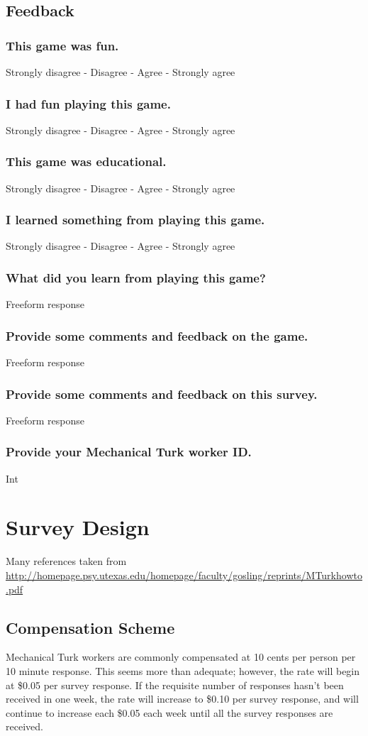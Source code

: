 	\subsection{Feedback}
		\subsubsection{This game was fun.} Strongly disagree - Disagree - Agree - Strongly agree
		\subsubsection{I had fun playing this game.} Strongly disagree - Disagree - Agree - Strongly agree
		\subsubsection{This game was educational.} Strongly disagree - Disagree - Agree - Strongly agree
		\subsubsection{I learned something from playing this game.} Strongly disagree - Disagree - Agree - Strongly agree
		\subsubsection{What did you learn from playing this game?} Freeform response
		\subsubsection{Provide some comments and feedback on the game.} Freeform response
		\subsubsection{Provide some comments and feedback on this survey.} Freeform response
		\subsubsection{Provide your Mechanical Turk worker ID.} Int

		\newpage

\section{Survey Design}
Many references taken from \url{http://homepage.psy.utexas.edu/homepage/faculty/gosling/reprints/MTurkhowto.pdf}
	\subsection{Compensation Scheme}
		Mechanical Turk workers are commonly compensated at 10 cents per person per 10 minute response. This seems more than adequate; however, the rate will begin at \$0.05 per survey response. If the requisite number of responses hasn't been received in one week, the rate will increase to \$0.10 per survey response, and will continue to increase each \$0.05 each week until all the survey responses are received.
